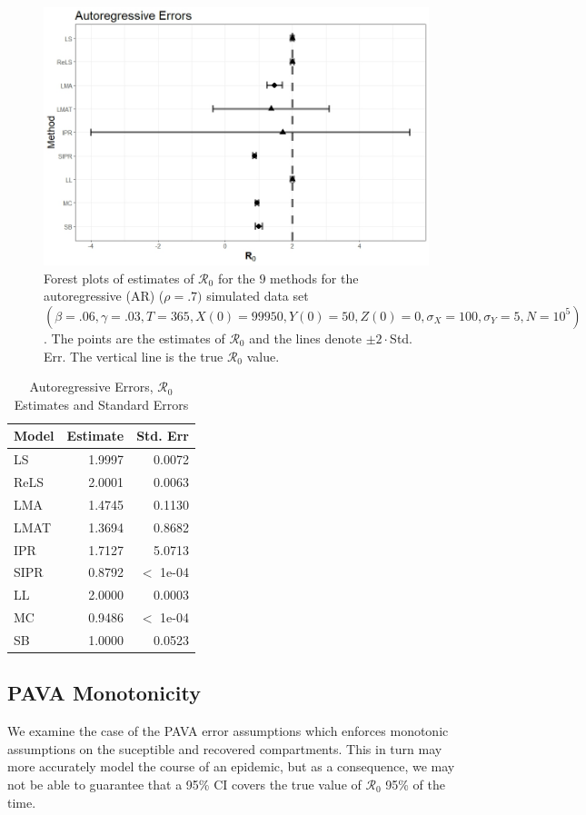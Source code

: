 \documentclass[12pt]{article}
\newcommand{\xxsir}{\ensuremath{9} } %
\newcommand{\rr}{\ensuremath{\mathcal{R}_0}}
\begin{document}
\begin{figure}[H]
  \centering
  \includegraphics[scale=0.5]{images/AR.jpeg}
  \caption{Forest plots of estimates of $\rr$ for the \xxsir methods for the autoregressive (AR) ($\rho=.7)$ simulated data set $(\beta=.06, \gamma=.03, T=365, X(0)=99950, Y(0)=50, Z(0)=0, \sigma_X=100, \sigma_Y=5, N=10^5)$.  The points are the estimates of $\rr$ and the lines denote $\pm 2\cdot $Std. Err.  The vertical line is the true $\rr$ value.}
  \end{figure}\label{fig:ar-res}
\begin{table}[H]
	
	\centering
	\begin{tabular}[t]{l|r|r}
		\hline
		Model & Estimate & Std. Err\\
		\hline
		LS & 1.9997 & 0.0072\\
		\hline
		ReLS & 2.0001 & 0.0063\\
		\hline
		LMA & 1.4745 & 0.1130\\
		\hline
		LMAT & 1.3694 & 0.8682\\
		\hline
		IPR & 1.7127 & 5.0713\\
		\hline
		SIPR & 0.8792 & $<$ 1e-04 \\
		\hline
		LL & 2.0000 & 0.0003\\
		\hline
		MC & 0.9486 & $<$ 1e-04 \\
		\hline
		SB & 1.0000 & 0.0523\\
		\hline
	\end{tabular}
        \caption{Autoregressive Errors, $\rr$ Estimates and Standard Errors}\label{tab:ar-res}
\end{table}

\subsection{PAVA Monotonicity}\label{sec:res-PAVA}
We examine the case of the PAVA error assumptions which enforces monotonic assumptions on the suceptible and recovered compartments.  This in turn may more accurately model the course of an epidemic, but as a consequence, we may not be able to guarantee that a 95\% CI covers the true value of $\rr$ 95\% of the time.
\end{document}
